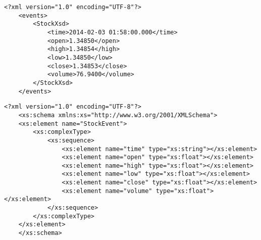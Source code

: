 	\begin{lstlisting}[label=lst:rest-api,caption=Príklad volaní REST API]
	<?xml version="1.0" encoding="UTF-8"?>
	<events>
	    <StockXsd>
		    <time>2014-02-03 01:58:00.000</time>
		    <open>1.34850</open>
		    <high>1.34854</high>
		    <low>1.34850</low>
		    <close>1.34853</close>
		    <volume>76.9400</volume>
	    </StockXsd>
	</events>
	\end{lstlisting}
	
	\begin{lstlisting}[label=lst:rest-api,caption=Príklad volaní REST API]
	<?xml version="1.0" encoding="UTF-8"?>
	<xs:schema xmlns:xs="http://www.w3.org/2001/XMLSchema">
	<xs:element name="StockEvent">
		<xs:complexType>
			<xs:sequence>
				<xs:element name="time" type="xs:string"></xs:element>
				<xs:element name="open" type="xs:float"></xs:element>
				<xs:element name="high" type="xs:float"></xs:element>
				<xs:element name="low" type="xs:float"></xs:element>
				<xs:element name="close" type="xs:float"></xs:element>
				<xs:element name="volume" type="xs:float"></xs:element>
			</xs:sequence>
		</xs:complexType>
	</xs:element>
	</xs:schema>

	\end{lstlisting}